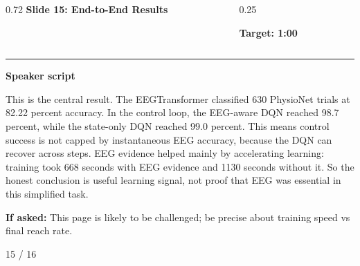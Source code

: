 \documentclass[aspectratio=169,10pt]{beamer}
\begin{document}
\begin{frame}[plain]
\vspace*{0.16cm}
\begin{columns}[T,totalwidth=\textwidth]
\begin{column}{0.72\textwidth}
{\fontsize{17}{18.5}\selectfont\bfseries Slide 15: End-to-End Results}
\end{column}
\begin{column}{0.25\textwidth}
\raggedleft
\colorbox{noteCream}{\parbox{0.88\linewidth}{\centering\bfseries Target: 1:00}}
\end{column}
\end{columns}
\vspace{0.10cm}
{\color{uomPurple}\rule{\textwidth}{1.2pt}}
\vspace{0.18cm}
{\color{uomPurple}\bfseries Speaker script}
\vspace{0.06cm}
\setlength{\fboxsep}{6pt}
\noindent\colorbox{panelGrey}{\begin{minipage}{0.94\textwidth}
\justifying\fontsize{11.0}{13.4}\selectfont
This is the central result. The EEGTransformer classified 630 PhysioNet trials at 82.22 percent accuracy. In the control loop, the EEG-aware DQN reached 98.7 percent, while the state-only DQN reached 99.0 percent. This means control success is not capped by instantaneous EEG accuracy, because the DQN can recover across steps. EEG evidence helped mainly by accelerating learning: training took 668 seconds with EEG evidence and 1130 seconds without it. So the honest conclusion is useful learning signal, not proof that EEG was essential in this simplified task.
\end{minipage}}
\vspace{0.22cm}
\noindent\colorbox{noteCream}{\begin{minipage}{0.94\textwidth}
\fontsize{9.6}{11.6}\selectfont
{\bfseries If asked:} This page is likely to be challenged; be precise about training speed vs final reach rate.
\end{minipage}}
\vfill
\hfill{\color{textDark}\scriptsize 15 / 16}
\end{frame}
\end{document}
